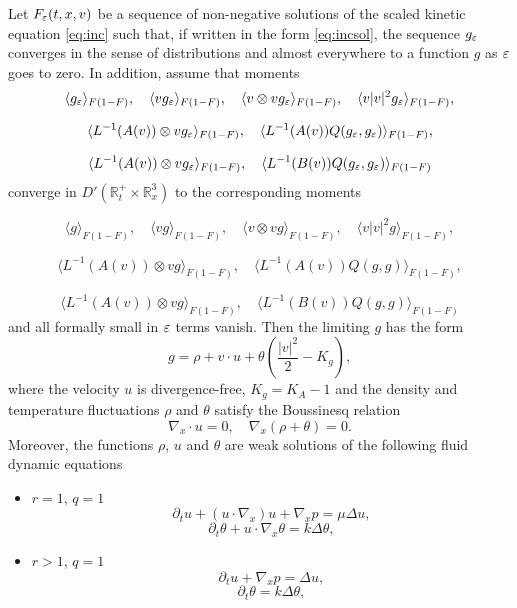 \begin{theorem}\label{th:INSE}
 Let $F_{\varepsilon}(t,x,v)$ be a sequence of non-negative solutions of the scaled
kinetic equation \eqref{eq:inc} such that, if written in the form \eqref{eq:incsol}, the sequence
$g_{\varepsilon}$ converges in the sense of distributions and almost everywhere to
a function $g$ as ${\varepsilon}$ goes to zero. In addition, assume that
moments
\[\langle g_{\varepsilon}\rangle_{F(1-F)},\quad \langle
vg_{\varepsilon}\rangle_{F(1-F)},\quad \langle v\otimes v g_{\varepsilon}\rangle_{F(1-F)},\quad\langle v|v|^2
g_{\varepsilon}\rangle_{F(1-F)},\]

\[\langle L^{-1}(A(v))\otimes vg_{\varepsilon}\rangle_{F(1-F)},\quad \langle
L^{-1}(A(v))Q(g_{\varepsilon},g_{\varepsilon})\rangle_{F(1-F)},\]

\[\langle L^{-1}(A(v))\otimes vg_{\varepsilon}\rangle_{F(1-F)},\quad \langle
L^{-1}(B(v))Q(g_{\varepsilon},g_{\varepsilon})\rangle_{F(1-F)}\]
converge in $D'(\mathbb R^+_t\times\mathbb R^3_x)$ to the corresponding moments

\[\langle g\rangle_{F(1-F)},\quad \langle vg\rangle_{F(1-F)},\quad \langle v\otimes v g\rangle_{F(1-F)},\quad \langle
v|v|^2 g\rangle_{F(1-F)},\]

\[\langle L^{-1}(A(v))\otimes vg\rangle_{F(1-F)},\quad \langle
L^{-1}(A(v))Q(g,g)\rangle_{F(1-F)},\]

\[\langle L^{-1}(A(v))\otimes vg\rangle_{F(1-F)},\quad \langle
L^{-1}(B(v))Q(g,g)\rangle_{F(1-F)}\]
and all formally small in ${\varepsilon}$ terms vanish. Then the limiting $g$ has
the form
\begin{equation}
 g=\rho+v\cdot u +\theta \left(\frac{|v|^2}{2}-K_g\right), \label{eq:incg}
\end{equation}
where the  velocity $u$ is divergence-free, $K_g=K_A -1$ and the density and 
temperature
fluctuations $\rho$ and $\theta$ satisfy the Boussinesq relation
\begin{equation}
 \nabla_x\cdot u =0,\quad \nabla_x(\rho+\theta)=0.\label{eq:incBouss}
\end{equation}
Moreover, the functions $\rho$, $u$ and $\theta$ are weak solutions of the following fluid dynamic
equations

\begin{itemize}
 \item $r=1$, $q=1$
\begin{equation}  \partial_t u+   (u\cdot \nabla_x) u  
 +\nabla_x p
=\mu \Delta u,  \label{eq:incU11}\end{equation}
\begin{equation} 
 \partial_t \theta +   u\cdot \nabla_x\theta= k \Delta\theta,
 \label{eq:incTH11}\end{equation}
\item $r>1$, $q=1$
\begin{equation} \partial_t   u+\nabla_x p=  \Delta u,\label{eq:incU21}\end{equation}
\begin{equation}
\partial_t \theta  = k \Delta\theta, \label{eq:incTH21}\end{equation}


\end{itemize}
\end{theorem}
